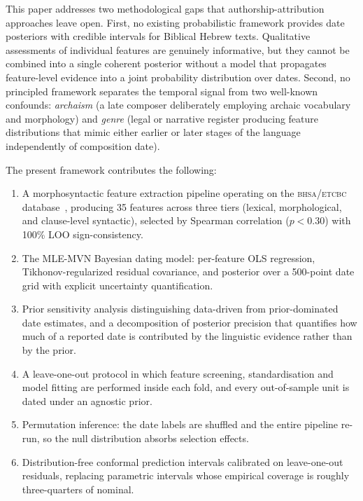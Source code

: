 \documentclass[10pt,letterpaper]{article}
\newcommand{\bhsa}{\textsc{bhsa}}
\newcommand{\mvn}{MLE-MVN}
\begin{document}
This paper addresses two methodological gaps that authorship-attribution
approaches leave open.  First, no existing probabilistic framework
provides date posteriors with credible intervals for Biblical Hebrew texts.
Qualitative assessments of individual features are genuinely informative,
but they cannot be combined into a single coherent posterior without a
model that propagates feature-level evidence into a joint probability
distribution over dates.  Second, no principled framework separates the
temporal signal from two well-known confounds:
\emph{archaism} (a late composer deliberately employing archaic vocabulary
and morphology) and \emph{genre} (legal or narrative register producing
feature distributions that mimic either earlier or later stages of the
language independently of composition date).

The present framework contributes the following:
\begin{enumerate}
  \item A morphosyntactic feature extraction pipeline operating on the
    \bhsa{}/\textsc{etcbc} database~\cite{BHSA2021,Roorda2018}, producing
    35 features across three tiers (lexical, morphological, and
    clause-level syntactic), selected by Spearman correlation ($p < 0.30$)
    with 100\% LOO sign-consistency.
  \item The \mvn{} Bayesian dating model: per-feature OLS regression,
    Tikhonov-regularized residual covariance, and posterior over a
    500-point date grid with explicit uncertainty quantification.
  \item Prior sensitivity analysis distinguishing data-driven from
    prior-dominated date estimates, and a decomposition of posterior
    precision that quantifies how much of a reported date is contributed
    by the linguistic evidence rather than by the prior.
  \item A leave-one-out protocol in which feature screening,
    standardisation and model fitting are performed inside each fold, and
    every out-of-sample unit is dated under an agnostic prior.
  \item Permutation inference: the date labels are shuffled and the entire
    pipeline re-run, so the null distribution absorbs selection effects.
  \item Distribution-free conformal prediction intervals calibrated on
    leave-one-out residuals, replacing parametric intervals whose empirical
    coverage is roughly three-quarters of nominal.
\end{enumerate}
\end{document}
